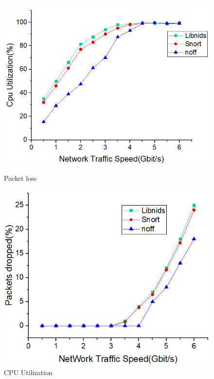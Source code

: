 \documentclass[conference]{IEEEtran}
\begin{document}
\begin{figure}
\begin{minipage}[t]{0.49\linewidth}
\flushleft
\includegraphics[width=\textwidth]{./picture/Figure6.jpg}
\caption{Packet loss} 
\label{fig:7}
\end{minipage}
\begin{minipage}[t]{0.49\linewidth}
\flushright
\includegraphics[width=\textwidth]{./picture/Figure7.jpg}
\caption{CPU Utilization}
\label{fig:8}
\end{minipage}
\end{figure} 
\end{document}
